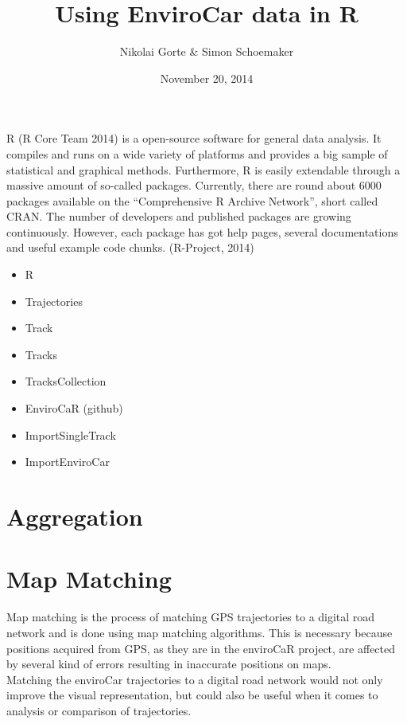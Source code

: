 \documentclass[]{article}
\title{Using EnviroCar data in R}
\author{Nikolai Gorte \& Simon Schoemaker}
\date{November 20, 2014}
\begin{document}
\maketitle


 R (R Core Team 2014) is a open-source software for general data
analysis. It compiles and runs on a wide variety of platforms and
provides a big sample of statistical and graphical methods. Furthermore,
R is easily extendable through a massive amount of so-called packages.
Currently, there are round about 6000 packages available on the
``Comprehensive R Archive Network'', short called CRAN. The number of
developers and published packages are growing continuously. However,
each package has got help pages, several documentations and useful
example code chunks. (R-Project, 2014)

\begin{itemize}
\itemsep1pt\parskip0pt
\item
  R
\item
  Trajectories
\item
  Track
\item
  Tracks
\item
  TracksCollection
\item
  EnviroCaR (github)
\item
  ImportSingleTrack
\item
  ImportEnviroCar
\end{itemize}

\section{Aggregation}\label{aggregation}

\newpage 

\section{Map Matching}\label{map-matching}

Map matching is the process of matching GPS trajectories to a digital
road network and is done using map matching algorithms. This is
necessary because positions acquired from GPS, as they are in the
enviroCaR project, are affected by several kind of errors resulting in
inaccurate positions on maps.\\Matching the enviroCar trajectories to a
digital road network would not only improve the visual representation,
but could also be useful when it comes to analysis or comparison of
trajectories.
\end{document}
